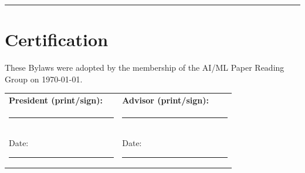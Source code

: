 \documentclass[12pt]{article}
\newcommand{\orgname}{AI/ML Paper Reading Group}
\begin{document}
\vspace{1em}
\noindent\rule{\textwidth}{0.4pt}

\section*{Certification}
These Bylaws were adopted by the membership of the \orgname{} on \today.

\vspace{2em}
\noindent\begin{tabular}{@{}p{0.45\linewidth}p{0.45\linewidth}}
\textbf{President (print/sign):} & \textbf{Advisor (print/sign):} \\
\rule{0.9\linewidth}{0.4pt} & \rule{0.9\linewidth}{0.4pt} \\
Date: \rule{0.75\linewidth}{0.4pt} & Date: \rule{0.75\linewidth}{0.4pt} \\
\end{tabular}
\end{document}
